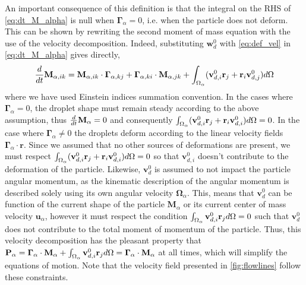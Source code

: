 An important consequence of this definition is that the integral on the RHS of \ref{eq:dt_M_alpha} is null when $\bm\Gamma_\alpha = 0$, i.e. when the particle does not deform. 
This can be shown by rewriting the second moment of mass equation with the use of the velocity decomposition.
Indeed, substituting $\textbf{w}_d^0$ with \ref{eq:def_vel} in \ref{eq:dt_M_alpha} gives directly,
\begin{equation*}
    \frac{d}{dt} \textbf{M}_{\alpha,ik}
    = 
    \textbf{M}_{\alpha,ik} \cdot \bm\Gamma_{\alpha,kj}
    +  \bm\Gamma_{\alpha,ki} \cdot \textbf{M}_{\alpha,jk}
    +
    \int_{\Omega_{\alpha}}  
        (\textbf{v}_{d,i}^0\textbf{r}_j
        + \textbf{r}_i\textbf{v}_{d,j}^0)
     d\Omega
\end{equation*}
where we have used Einstein indices summation convention. 
In the cases where $\bm\Gamma_\alpha = 0$, the droplet shape must remain steady according to the above assumption, thus $\frac{d}{dt} \textbf{M}_\alpha = 0$ and consequently $\int_{\Omega_{\alpha}} (\textbf{v}^0_{d,i} \textbf{r}_j + \textbf{r}_i \textbf{v}_{d,i}^0) d\Omega = 0$. 
In the case where $\bm\Gamma_\alpha \neq 0$ the droplets deform according to the linear velocity fields $\bm\Gamma_\alpha \cdot \textbf{r}$.
Since we assumed that no other sources of deformations are present, we must respect $\int_{\Omega_{\alpha}} (\textbf{v}^0_{d,i} \textbf{r}_j + \textbf{r}_i \textbf{v}_{d,i}^0) d\Omega = 0$ so that $\textbf{v}^0_{d,i} $ doesn't contribute to the deformation of the particle.
Likewise, $\textbf{v}_d^0$ is assumed to not impact the particle angular momentum, as the kinematic description of the angular momentum is described solely using its own angular velocity $\bm\Omega_\alpha$. 
This, means that $\textbf{v}^0_{d}$ can be function of the current shape of the particle $\textbf{M}_\alpha$ or its current center of mass velocity $\textbf{u}_\alpha$, however it must respect the condition $\int_{\Omega_{\alpha}} \textbf{v}^0_{d,i} \textbf{r}_j d\Omega  = 0$ such that $\textbf{v}_d^0$ does not contribute to the total moment of momentum of the particle. 
Thus, this velocity decomposition has the pleasant property that $\textbf{P}_\alpha = \bm\Gamma_\alpha \cdot \textbf{M}_\alpha + \int_{\Omega_{\alpha}} \textbf{v}^0_{d,i} \textbf{r}_j d\Omega =  \bm\Gamma_\alpha \cdot \textbf{M}_\alpha $ at all times, which will simplify the equations of motion. 
Note that the velocity field presented in \ref{fig:flowlines} follow these constraints. 

